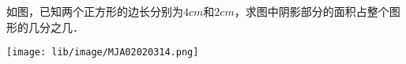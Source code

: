如图，已知两个正方形的边长分别为$4cm$和$2cm$，求图中阴影部分的面积占整个图形的几分之几．
\begin{center}
	\texttt{[image: lib/image/MJA02020314.png]}
	\vspace{0.5cm}
\end{center}